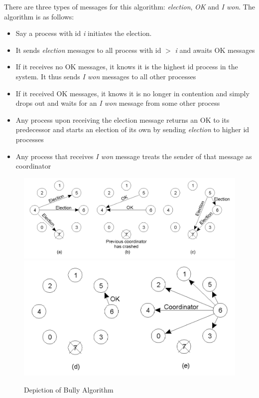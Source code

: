\documentclass[twoside]{article}
\begin{document}
There are three types of messages for this algorithm: \emph{election}, \emph{OK} and \emph{I won}. The algorithm is as follows:
\begin{itemize}
\item{Say a process with id \emph{i} initiates the election.}
\item{It sends \emph{election} messages to all process with id $>$ \emph{i} and awaits OK messages}
\item{If it receives no OK messages, it knows it is the highest id process in the system. It thus sends \emph{I won} messages to all other processes}
\item{If it received OK messages, it knows it is no longer in contention and simply drops out and waits for an \emph{I won} message from some other process}
\item{Any process upon receiving the election message returns an OK to its predecessor and starts an election of its own by sending \emph{election} to higher id processes}
\item{Any process that receives \emph{I won} message treats the sender of that message as coordinator}
\end{itemize}
\begin{figure}[h!]
\centering
\includegraphics[scale=0.25]{./bully_1.png}
\includegraphics[scale=0.25]{./bully_2.png}
\caption{Depiction of Bully Algorithm}
\label{fig:bully}
\end{figure} 
\end{document}
